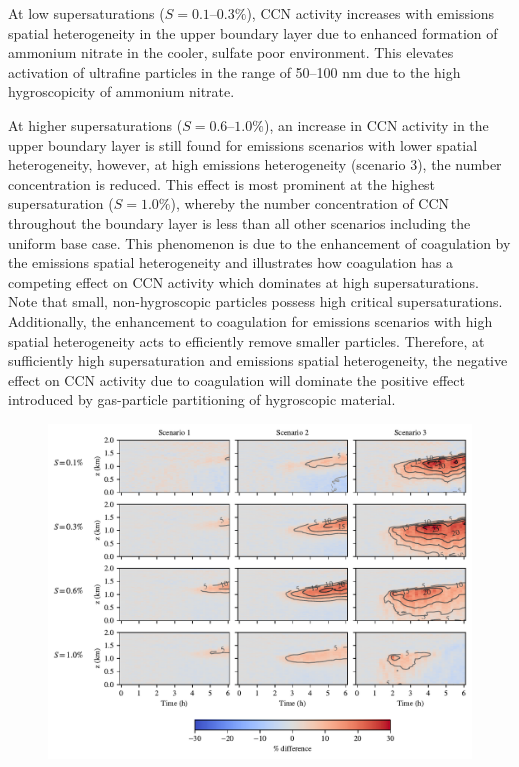 \documentclass[journal abbreviation, manuscript]{copernicus}
\begin{document}
At low supersaturations ($S=0.1\text{--}0.3\%$), CCN activity increases with emissions spatial heterogeneity in the upper boundary layer due to enhanced formation of ammonium nitrate in the cooler, sulfate poor environment. This elevates activation of ultrafine particles in the range of 50--100 nm due to the high hygroscopicity of ammonium nitrate. 

At higher supersaturations ($S=0.6\text{--}1.0\%$), an increase in CCN activity in the upper boundary layer is still found for emissions scenarios with lower spatial heterogeneity, however, at high emissions heterogeneity (scenario 3), the number concentration is reduced. This effect is most prominent at the highest supersaturation ($S=1.0\%$), whereby the number concentration of CCN throughout the boundary layer is less than all other scenarios including the uniform base case. This phenomenon is due to the enhancement of coagulation by the emissions spatial heterogeneity and illustrates how coagulation has a competing effect on CCN activity which dominates at high supersaturations. Note that small, non-hygroscopic particles possess high critical supersaturations. Additionally, the enhancement to coagulation for emissions scenarios with high spatial heterogeneity acts to efficiently remove smaller particles. Therefore, at sufficiently high supersaturation and emissions spatial heterogeneity, the negative effect on CCN activity due to coagulation will dominate the positive effect introduced by gas-particle partitioning of hygroscopic material. 

\begin{figure}[!h]
	\centering
	\includegraphics[]{figures/height-time-ccn-pdiff-multi-scenario.pdf}
	\caption{}
	\label{fig:time-height-ccn-pdiff}
\end{figure} 
\end{document}

